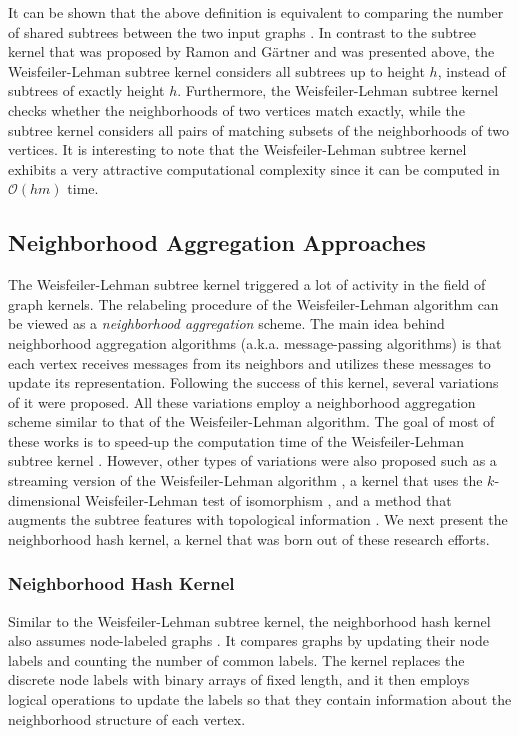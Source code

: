 \documentclass[twoside,11pt]{article}
\begin{document}
It can be shown that the above definition is equivalent to comparing the number of shared subtrees between the two input graphs .
In contrast to the subtree kernel that was proposed by Ramon and G{\"a}rtner and was presented above, the Weisfeiler-Lehman subtree kernel considers all subtrees up to height $h$, instead of subtrees of exactly height $h$.
Furthermore, the Weisfeiler-Lehman subtree kernel checks whether the neighborhoods of two vertices match exactly, while the subtree kernel considers all pairs of matching subsets of the neighborhoods of two vertices.
It is interesting to note that the Weisfeiler-Lehman subtree kernel exhibits a very attractive computational complexity since it can be computed in $\mathcal{O}(hm)$ time.


\subsection{Neighborhood Aggregation Approaches}
The Weisfeiler-Lehman subtree kernel triggered a lot of activity in the field of graph kernels.
The relabeling procedure of the Weisfeiler-Lehman algorithm can be viewed as a \textit{neighborhood aggregation} scheme.
The main idea behind neighborhood aggregation algorithms (a.k.a. message-passing algorithms) is that each vertex receives messages from its neighbors and utilizes these messages to update its representation.
Following the success of this kernel, several variations of it were proposed.
All these variations employ a neighborhood aggregation scheme similar to that of the Weisfeiler-Lehman algorithm.
The goal of most of these works is to speed-up the computation time of the Weisfeiler-Lehman subtree kernel .
However, other types of variations were also proposed such as a streaming version of the Weisfeiler-Lehman algorithm , a kernel that uses the $k$-dimensional Weisfeiler-Lehman test of isomorphism , and a method that augments the subtree features with topological information .
We next present the neighborhood hash kernel, a kernel that was born out of these research efforts.

\subsubsection{Neighborhood Hash Kernel}
Similar to the Weisfeiler-Lehman subtree kernel, the neighborhood hash kernel also assumes node-labeled graphs .
It compares graphs by updating their node labels and counting the number of common labels.
The kernel replaces the discrete node labels with binary arrays of fixed length, and it then employs logical operations to update the labels so that they contain information about the neighborhood structure of each vertex.
\end{document}
